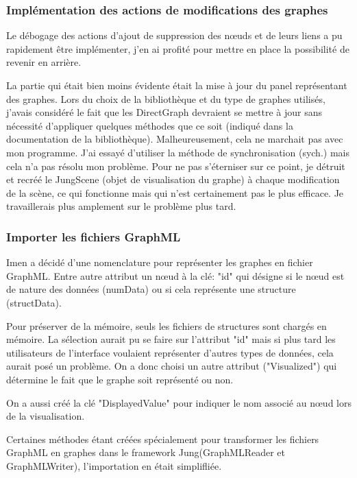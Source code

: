 \documentclass[french]{article}
\begin{document}
  \subsubsection{Implémentation des actions de modifications des graphes}

    Le débogage des actions d'ajout de suppression des nœuds
    et de leurs liens a pu rapidement être implémenter, j'en ai profité pour
    mettre en place la possibilité de revenir en arrière. 

    La partie qui était bien moins évidente était la mise à jour du panel
    représentant des graphes. Lors du choix de la bibliothèque et du type de graphes
    utilisés, j'avais considéré le fait que les 
    DirectGraph devraient se mettre à jour sans nécessité d'appliquer quelques méthodes 
    que ce soit (indiqué dans la documentation de la bibliothèque). Malheureusement, cela ne marchait pas avec mon programme. J'ai essayé
    d'utiliser la méthode de synchronisation (sych.) mais cela n'a pas résolu mon problème.
    Pour ne pas s'éterniser sur ce point, je détruit et recréé le JungScene (objet de visualisation du graphe) à chaque modification 
    de la scène, ce qui fonctionne mais qui n'est certainement pas le plus efficace. 
    Je travaillerais plus amplement sur le problème plus tard.  

  \subsubsection{Importer les fichiers GraphML}

    Imen a décidé d'une nomenclature pour représenter les graphes en fichier 
    GraphML. Entre autre attribut un nœud à la clé: "id" qui désigne si le nœud
    est de nature des données (numData) ou si cela représente une structure (structData).

    Pour préserver de la mémoire, seuls les fichiers de structures sont chargés en 
    mémoire. La sélection aurait pu se faire sur l'attribut "id" mais si plus tard les 
    utilisateurs de l'interface voulaient représenter d'autres types de données, cela aurait posé un problème. On a donc
    choisi un autre attribut ("Visualized") qui détermine le fait que le graphe soit représenté ou non. 

    On a aussi créé la clé "DisplayedValue" pour indiquer le nom associé au nœud lors de la visualisation.

    Certaines méthodes étant créées spécialement pour transformer les fichiers 
    GraphML en graphes dans le framework Jung(GraphMLReader et GraphMLWriter), l'importation en était simplifliée.
 
\end{document}
